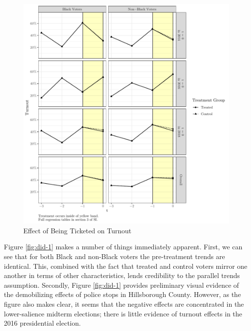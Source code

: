 \documentclass[
  12pt,
]{article}
\begin{document}
\begin{figure}[H]

{\centering \includegraphics{draft_paper_files/figure-latex/did1-1} 

}

\caption{\label{fig:did-1}Effect of Being Ticketed on Turnout}\label{fig:did1}
\end{figure}

Figure \ref{fig:did-1} makes a number of things immediately apparent. First, we can see that for both Black and non-Black voters the pre-treatment trends are identical. This, combined with the fact that treated and control voters mirror one another in terms of other characteristics, lends credibility to the parallel trends assumption. Secondly, Figure \ref{fig:did-1} provides preliminary visual evidence of the demobilizing effects of police stops in Hillsborough County. However, as the figure also makes clear, it seems that the negative effects are concentrated in the lower-salience midterm elections; there is little evidence of turnout effects in the 2016 presidential election.
\end{document}
